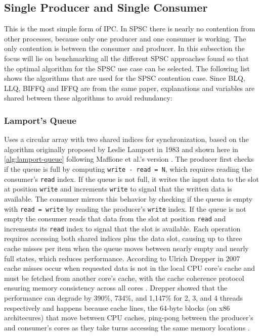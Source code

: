 \subsection{Single Producer and Single Consumer}\label{subsec:single-producer-and-single-consumer}
This is the most simple form of \ac{IPC}. In \ac{SPSC} there is nearly no contention from other processes, because only one producer and one consumer is working. The only contention is between the consumer and producer. In this subsection the focus will lie on benchmarking all the different \ac{SPSC} approaches found so that the optimal algorithm for the \ac{SPSC} use case can be selected. The following list shows the algorithms that are used for the \ac{SPSC} contention case. Since \ac{BLQ}, \ac{LLQ}, \ac{BIFFQ} and \ac{IFFQ} are from the same paper, explanations and variables are shared between these algorithms to avoid redundancy:
\subsubsection{Lamport's Queue}
Uses a circular array with two shared indices for synchronization, based on the algorithm originally proposed by Leslie Lamport in 1983 \cite{Lamport1983SPSCCircularBuffer} and shown here in \cref{alg:lamport-queue} following Maffione et al.'s version \cite{MaffioneCacheAware}. The producer first checks if the queue is full by computing \texttt{write - read = N}, which requires reading the consumer's \texttt{read} index. If the queue is not full, it writes the input data to the slot at position \texttt{write} and increments \texttt{write} to signal that the written data is available. The consumer mirrors this behavior by checking if the queue is empty with \texttt{read = write} by reading the producer's \texttt{write} index. If the queue is not empty the consumer reads that data from the slot at position \texttt{read} and increments its \texttt{read} index to signal that the slot is available. Each operation requires accessing both shared indices plus the data slot, causing up to three cache misses per item when the queue moves between nearly empty and nearly full states, which reduces performance. According to Ulrich Drepper in 2007 cache misses occur when requested data is not in the local CPU core's cache and must be fetched from another core's cache, with the cache coherence protocol ensuring memory consistency across all cores \cite{drepper2007every}. Drepper showed that the performance can degrade by 390\%, 734\%, and 1,147\% for 2, 3, and 4 threads respectively and happens because cache lines, the 64-byte blocks (on x86 architecures) that move between CPU caches, ping-pong between the producer's and consumer's cores as they take turns accessing the same memory locations \cite{drepper2007every}.

